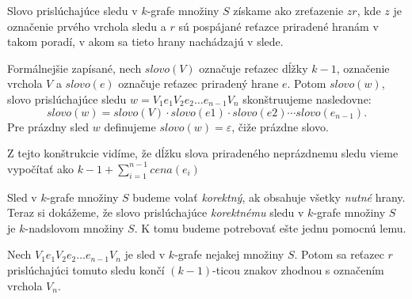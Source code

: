Slovo prislúchajúce sledu v $k$-grafe množiny $S$ získame ako zreťazenie $zr$, kde $z$ je
označenie prvého vrchola sledu a $r$ sú pospájané reťazce priradené hranám v takom
poradí, v akom sa tieto hrany nachádzajú v slede.

Formálnejšie zapísané, nech $slovo(V)$ označuje reťazec dĺžky $k-1$, označenie vrchola
$V$ a $slovo(e)$ označuje reťazec priradený hrane $e$. Potom $slovo(w)$, slovo
prislúchajúce sledu $w = V_1 e_1 V_2 e_2 \ldots e_{n-1} V_n$ skonštruujeme nasledovne: 
$$slovo(w) = slovo(V) \cdot slovo(e1) \cdot slovo(e2) \cdots slovo(e_{n-1}).$$
Pre prázdny sled $w$ definujeme $slovo(w) = \varepsilon$, čiže prázdne slovo.

Z tejto konštrukcie vidíme, že dĺžku slova priradeného neprázdnemu sledu vieme
vypočítať ako $k-1 + \sum \limits_{i=1}^{n-1} cena(e_i)$

Sled v $k$-grafe množiny $S$ budeme volať \emph{korektný}, ak obsahuje všetky \emph{nutné} hrany.
Teraz si dokážeme, že slovo prislúchajúce \emph{korektnému} sledu v $k$-grafe množiny $S$ je
$k$-nadslovom množiny $S$. K tomu budeme potrebovať ešte jednu pomocnú lemu.

\begin{lema}
\label{vertex_end_lemma}
    Nech $V_1 e_1 V_2 e_2 \ldots e_{n-1} V_n$ je sled v $k$-grafe nejakej množiny $S$.
    Potom sa reťazec $r$ prislúchajúci tomuto sledu končí $(k-1)$-ticou znakov zhodnou
    s označením vrchola $V_n$.
\end{lema}

